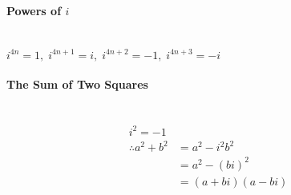 \documentclass[a4paper]{article}
\begin{document}
				\paragraph{Powers of $i$}\mbox{}\\
					$i^{4n}=1,\;i^{4n+1}=i,\;i^{4n+2}=-1,\;i^{4n+3}=-i$
				\paragraph{The Sum of Two Squares}\mbox{}\\
					\begin{align*}
						i^2=-1\\
						\therefore a^2+b^2&=a^2-i^2b^2 \\
						&=a^2-(bi)^2 \\
						&=(a+bi)(a-bi)
					\end{align*}
\end{document}
